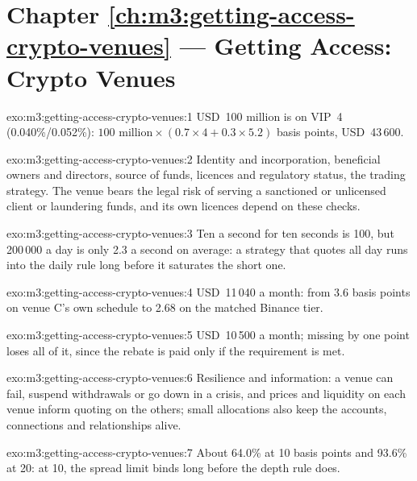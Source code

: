 \section*{Chapter \ref{ch:m3:getting-access-crypto-venues} --- Getting Access: Crypto Venues}

\begin{solution}{exo:m3:getting-access-crypto-venues:1}
USD~100 million is on VIP~4 (0.040\%/0.052\%): $100\text{ million} \times (0.7 \times 4 + 0.3 \times 5.2)$ basis points, USD~43\,600.
\end{solution}

\begin{solution}{exo:m3:getting-access-crypto-venues:2}
Identity and incorporation, beneficial owners and directors, source of funds, licences and regulatory status, the trading strategy. The
venue bears the legal risk of serving a sanctioned or unlicensed client or laundering funds, and its own licences depend on these checks.
\end{solution}

\begin{solution}{exo:m3:getting-access-crypto-venues:3}
Ten a second for ten seconds is 100, but 200\,000 a day is only 2.3 a second on average: a strategy that quotes all day runs into the daily
rule long before it saturates the short one.
\end{solution}

\begin{solution}{exo:m3:getting-access-crypto-venues:4}
USD~11\,040 a month: from 3.6 basis points on venue C's own schedule to 2.68 on the matched Binance tier.
\end{solution}

\begin{solution}{exo:m3:getting-access-crypto-venues:5}
USD~10\,500 a month; missing by one point loses all of it, since the rebate is paid only if the requirement is met.
\end{solution}

\begin{solution}{exo:m3:getting-access-crypto-venues:6}
Resilience and information: a venue can fail, suspend withdrawals or go down in a crisis, and prices and liquidity on each venue inform quoting
on the others; small allocations also keep the accounts, connections and relationships alive.
\end{solution}

\begin{solution}{exo:m3:getting-access-crypto-venues:7}
About 64.0\% at 10 basis points and 93.6\% at 20: at 10, the spread limit binds long before the depth rule does.
\end{solution}

